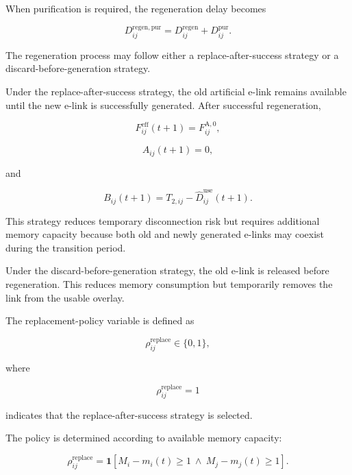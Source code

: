 When purification is required, the regeneration delay becomes

\begin{equation}
    D_{ij}^{\mathrm{regen,pur}}
    =
    D_{ij}^{\mathrm{regen}}
    +
    D_{ij}^{\mathrm{pur}}.
\end{equation}

The regeneration process may follow either a replace-after-success strategy or a discard-before-generation strategy.

Under the replace-after-success strategy, the old artificial e-link remains available until the new e-link is successfully generated. After successful regeneration,

\begin{equation}
    F_{ij}^{\mathrm{eff}}(t+1)
    =
    F_{ij}^{\mathrm{A},0},
\end{equation}

\begin{equation}
    A_{ij}(t+1)
    =
    0,
\end{equation}

and

\begin{equation}
    B_{ij}(t+1)
    =
    T_{2,ij}
    -
    \widehat{D}_{ij}^{\mathrm{use}}(t+1).
\end{equation}

This strategy reduces temporary disconnection risk but requires additional memory capacity because both old and newly generated e-links may coexist during the transition period.

Under the discard-before-generation strategy, the old e-link is released before regeneration. This reduces memory consumption but temporarily removes the link from the usable overlay.

The replacement-policy variable is defined as

\begin{equation}
    \rho_{ij}^{\mathrm{replace}}
    \in
    \{0,1\},
\end{equation}

where

\begin{equation}
    \rho_{ij}^{\mathrm{replace}}
    =
    1
\end{equation}

indicates that the replace-after-success strategy is selected.

The policy is determined according to available memory capacity:

\begin{equation}
    \rho_{ij}^{\mathrm{replace}}
    =
    \mathbf{1}
    \left[
    M_i-m_i(t)
    \geq
    1
    \ \land\
    M_j-m_j(t)
    \geq
    1
    \right].
\end{equation}


